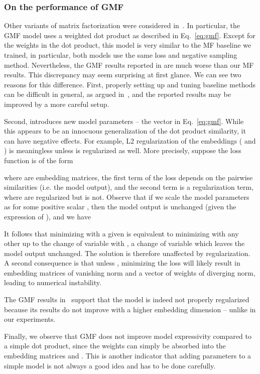 \documentclass{article}
\begin{document}
\subsubsection{On the performance of GMF}

Other variants of matrix factorization were considered in~\cite{he:www17}. In particular, the GMF model uses a weighted dot product  as described in Eq.~\eqref{eq:gmf}. Except for the weights in the dot product, this model is very similar to the MF baseline we trained, in particular, both models use the same loss and negative sampling method.
Nevertheless, the GMF results reported in \cite{he:www17} are much worse than our MF results.
This discrepancy may seem surprising at first glance. We can see two reasons for this difference.
First, properly setting up and tuning baseline methods can be difficult in general, as argued in~\cite{rendle:arxiv19}, and the reported results may be improved by a more careful setup.

Second,  introduces new model parameters -- the vector  in Eq.~\eqref{eq:gmf}.
While this appears to be an innocuous generalization of the dot product similarity, it can have negative effects.
For example, L2 regularization of the embeddings ( and ) is meaningless unless  is regularized as well.
More precisely, suppose the loss function is of the form

where  are embedding matrices, the first term of the loss  depends on the pairwise similarities (i.e. the model output), and the second term is a regularization term, where  are regularized but  is not. Observe that if we scale the model parameters as  for some positive scalar , then the model output is unchanged (given the expression of ), and we have

It follows that minimizing  with a given  is equivalent to minimizing  with any other  up to the change of variable  with , a change of variable which leaves the model output unchanged. The solution is therefore unaffected by regularization. A second consequence is that unless , minimizing the loss  will likely result in embedding matrices  of vanishing norm and a vector of weights  of diverging norm, leading to numerical instability.

The GMF results in~\cite{he:www17} support that the model is indeed not properly regularized because its results do not improve with a higher embedding dimension -- unlike in our experiments.

Finally, we observe that GMF does not improve model expressivity compared to a simple dot product, since the weights  can simply be absorbed into the embedding matrices  and .
This is another indicator that adding parameters to a simple model is not always a good idea and has to be done carefully.
\end{document}
